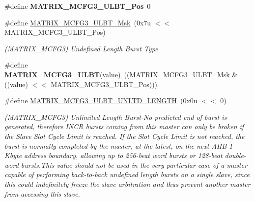 \begin{DoxyCompactItemize}
\mbox{\label{group__SAMS70__MATRIX_ga593430b723f80f2e0c905f75dd0e8a77}} 
\#define {\bfseries M\+A\+T\+R\+I\+X\+\_\+\+M\+C\+F\+G3\+\_\+\+U\+L\+B\+T\+\_\+\+Pos}~0
\item 
\mbox{\label{group__SAMS70__MATRIX_ga985afc9ed430615f27867fd084145e22}} 
\#define \mbox{\hyperlink{group__SAMS70__MATRIX_ga985afc9ed430615f27867fd084145e22}{M\+A\+T\+R\+I\+X\+\_\+\+M\+C\+F\+G3\+\_\+\+U\+L\+B\+T\+\_\+\+Msk}}~(0x7u $<$$<$ M\+A\+T\+R\+I\+X\+\_\+\+M\+C\+F\+G3\+\_\+\+U\+L\+B\+T\+\_\+\+Pos)
\begin{DoxyCompactList}\small\item\em (M\+A\+T\+R\+I\+X\+\_\+\+M\+C\+F\+G3) Undefined Length Burst Type \end{DoxyCompactList}\item 
\mbox{\label{group__SAMS70__MATRIX_gad59b776b725a01a0e4f5a885c22f941a}} 
\#define {\bfseries M\+A\+T\+R\+I\+X\+\_\+\+M\+C\+F\+G3\+\_\+\+U\+L\+BT}(value)~((\mbox{\hyperlink{group__SAMS70__MATRIX_ga985afc9ed430615f27867fd084145e22}{M\+A\+T\+R\+I\+X\+\_\+\+M\+C\+F\+G3\+\_\+\+U\+L\+B\+T\+\_\+\+Msk}} \& ((value) $<$$<$ M\+A\+T\+R\+I\+X\+\_\+\+M\+C\+F\+G3\+\_\+\+U\+L\+B\+T\+\_\+\+Pos)))
\item 
\mbox{\label{group__SAMS70__MATRIX_ga8f03fed31a60506e09d50fca5c848ba4}} 
\#define \mbox{\hyperlink{group__SAMS70__MATRIX_ga8f03fed31a60506e09d50fca5c848ba4}{M\+A\+T\+R\+I\+X\+\_\+\+M\+C\+F\+G3\+\_\+\+U\+L\+B\+T\+\_\+\+U\+N\+L\+T\+D\+\_\+\+L\+E\+N\+G\+TH}}~(0x0u $<$$<$ 0)
\begin{DoxyCompactList}\small\item\em (M\+A\+T\+R\+I\+X\+\_\+\+M\+C\+F\+G3) Unlimited Length Burst-\/\+No predicted end of burst is generated, therefore I\+N\+CR bursts coming from this master can only be broken if the Slave Slot Cycle Limit is reached. If the Slot Cycle Limit is not reached, the burst is normally completed by the master, at the latest, on the next A\+HB 1-\/Kbyte address boundary, allowing up to 256-\/beat word bursts or 128-\/beat double-\/word bursts.\+This value should not be used in the very particular case of a master capable of performing back-\/to-\/back undefined length bursts on a single slave, since this could indefinitely freeze the slave arbitration and thus prevent another master from accessing this slave. \end{DoxyCompactList}\item 
$$
\end{DoxyCompactItemize}
